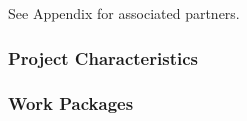 \documentclass[
  11pt,
]{article}
\begin{document}
See Appendix for associated partners.

\hypertarget{project-characteristics}{%
\subsubsection{Project Characteristics}\label{project-characteristics}}

\hypertarget{work-packages}{%
\subsubsection{Work Packages}\label{work-packages}}

\providecommand{\docline}[3]{\noalign{\global\setlength{\arrayrulewidth}{#1}}\arrayrulecolor[HTML]{#2}\cline{#3}}

\setlength{\tabcolsep}{2pt}

\renewcommand*{\arraystretch}{1.5}
\end{document}
